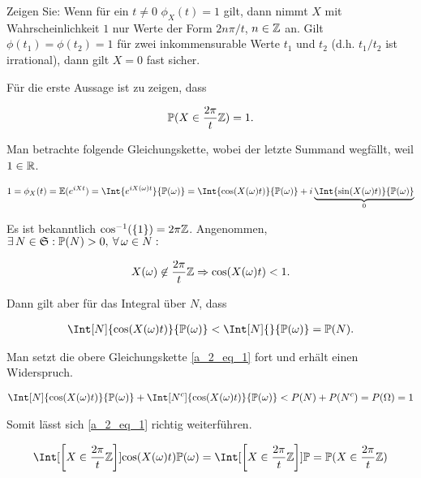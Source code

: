\begin{exercise}

Zeigen Sie: Wenn für ein $t \neq 0$ $\phi_X(t) = 1$ gilt, dann nimmt $X$ mit Wahrscheinlichkeit $1$ nur Werte der Form $2n \pi/t$, $n \in \mathbb{Z}$ an. Gilt $\phi(t_1) = \phi(t_2) = 1$ für zwei inkommensurable Werte $t_1$ und $t_2$ (d.h. $t_1/t_2$ ist irrational), dann gilt $X = 0$ fast sicher.

\end{exercise}

\begin{solution}

Für die erste Aussage ist zu zeigen, dass

\begin{align*}
  \mathbb{P}(X \in \frac{2 \pi}{t} \mathbb{Z}) = 1.
\end{align*}

Man betrachte folgende Gleichungskette, wobei der letzte Summand wegfällt, weil $1 \in \mathbb{R}$.

\begin{align}
  1
  = \phi_X(t)
  = \E(e^{iXt})
  = \Int{e^{iX(\omega)t}}{\P(\omega)}
  = \Int{\cos(X(\omega)t)}{\P(\omega)} +
    i \underbrace{\Int{\sin(X(\omega)t)}{\P(\omega)}}_0
  \label{a_2_eq_1}
\end{align}

Es ist bekanntlich $\cos^{-1}(\left \{ 1 \right \}) = 2 \pi \mathbb{Z}$. Angenommen, $\exists \, N \in \mathfrak{S}: \mathbb{P}(N) > 0, \: \forall \, \omega \in N:$

\begin{align*}
  X(\omega) \not \in \frac{2 \pi}{t} \mathbb{Z}
  \Rightarrow
  \cos(X(\omega)t) < 1.
\end{align*}

Dann gilt aber für das Integral über $N$, dass

\begin{align*}
  \Int[N]{\cos(X(\omega)t)}{\P(\omega)} <
  \Int[N]{}{\P(\omega)} =
  \P(N).
\end{align*}

Man setzt die obere Gleichungskette \eqref{a_2_eq_1} fort und erhält einen Widerspruch.

\begin{align*}
  \Int[N]{\cos(X(\omega)t)}{\P(\omega)} +
  \Int[N^c]{\cos(X(\omega)t)}{\P(\omega)} <
  P(N) + P(N^c) = P(\Omega) = 1
\end{align*}

Somit lässt sich \eqref{a_2_eq_1} richtig weiterführen.

\begin{align*}
  \Int[\bbraces{X \in \frac{2 \pi}{t} \Z}]{\cos(X(\omega)t)}{\P(\omega)}
  = \Int[\bbraces{X \in \frac{2 \pi}{t} \Z}]{}{\P}
  = \P(X \in \frac{2 \pi}{t} \Z)
\end{align*}


\end{solution}
